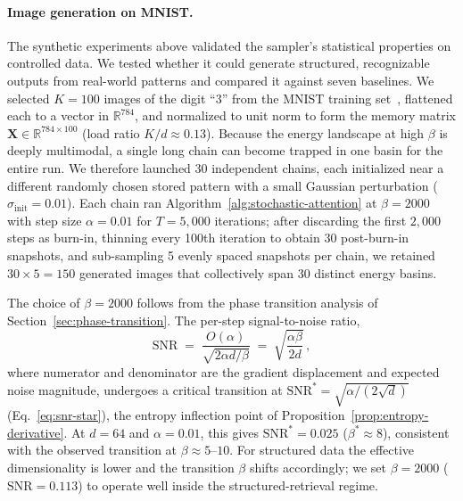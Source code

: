 \paragraph{Image generation on MNIST.}
The synthetic experiments above validated the sampler's statistical properties on controlled data. We tested whether it could generate structured, recognizable outputs from real-world patterns and compared it against seven baselines.
We selected $K=100$ images of the digit ``3'' from the MNIST training set~\cite{lecunGradientBasedLearningApplied1998}, flattened each to a vector in $\mathbb{R}^{784}$, and normalized to unit norm to form the memory matrix $\mathbf{X}\in\mathbb{R}^{784\times 100}$ (load ratio $K/d\approx 0.13$).
Because the energy landscape at high $\beta$ is deeply multimodal, a single long chain can become trapped in one basin for the entire run.
We therefore launched 30 independent chains, each initialized near a different randomly chosen stored pattern with a small Gaussian perturbation ($\sigma_{\mathrm{init}}=0.01$).
Each chain ran Algorithm~\ref{alg:stochastic-attention} at $\beta=2000$ with step size $\alpha=0.01$ for $T=5{,}000$ iterations; after discarding the first $2{,}000$ steps as burn-in, thinning every 100th iteration to obtain 30 post-burn-in snapshots, and sub-sampling 5 evenly spaced snapshots per chain, we retained $30\times 5=150$ generated images that collectively span 30 distinct energy basins.

The choice of $\beta=2000$ follows from the phase transition analysis of Section~\ref{sec:phase-transition}. The per-step signal-to-noise ratio,
\begin{equation}
\mathrm{SNR}
\;=\;\frac{O(\alpha)}{\sqrt{2\alpha d/\beta}}
\;=\;\sqrt{\frac{\alpha\beta}{2d}}\,,
\label{eq:snr}
\end{equation}
where numerator and denominator are the gradient displacement and expected noise magnitude, undergoes a critical transition at $\mathrm{SNR}^{*}=\sqrt{\alpha/(2\sqrt{d})}$ (Eq.~\ref{eq:snr-star}), the entropy inflection point of Proposition~\ref{prop:entropy-derivative}. At $d{=}64$ and $\alpha{=}0.01$, this gives $\mathrm{SNR}^{*}=0.025$ ($\beta^{*}\approx 8$), consistent with the observed transition at $\beta\approx 5$--$10$. For structured data the effective dimensionality is lower and the transition $\beta$ shifts accordingly; we set $\beta=2000$ ($\mathrm{SNR}=0.113$) to operate well inside the structured-retrieval regime.

